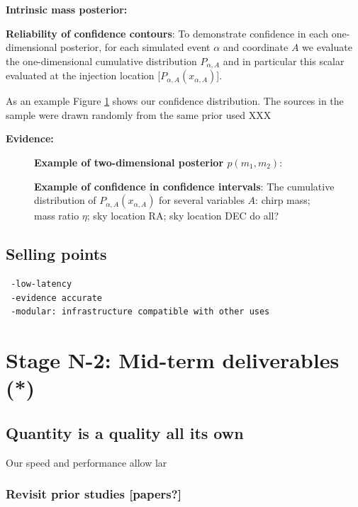 \documentclass[twocolumn,prd,nofootinbib]{revtex4}
\newcommand\editremark[1]{{\color{red} #1}}
\begin{document}
\noindent \textbf{Intrinsic mass posterior:}

\noindent \textbf{Reliability of confidence contours}: To demonstrate confidence in each one-dimensional posterior, for
each simulated event $\alpha$ and coordinate $A$ we evaluate the one-dimensional cumulative distribution $P_{\alpha,A}$
and in particular this scalar evaluated at the injection location [$P_{\alpha,A}(x_{\alpha,A})$].  

As an example Figure \ref{fig:ShortTermDemo:OneDCumulativeInjectionRecovery} shows our confidence distribution.
The sources in the sample were drawn randomly from the same prior used \editremark{XXX}

\noindent \textbf{Evidence:}



\begin{figure}
\caption{\textbf{Example of two-dimensional posterior $p(m_1,m_2)$}:
}
\end{figure}

\begin{figure}
\caption{\label{fig:ShortTermDemo:OneDCumulativeInjectionRecovery}\textbf{Example of confidence in confidence
    intervals}: The cumulative distribution of $P_{\alpha,A}(x_{\alpha,A})$ for several variables $A$: chirp mass; mass
  ratio $\eta$; sky location RA; sky location DEC \editremark{do all?}
}
\end{figure}

\subsection{Selling points}

\begin{verbatim}
 -low-latency
 -evidence accurate
 -modular: infrastructure compatible with other uses
\end{verbatim}



\section{Stage N-2: Mid-term deliverables  (*)}
\subsection{Quantity is a quality all its own}
Our speed and performance allow lar

\subsubsection{Revisit prior studies [papers?]}
\end{document}
